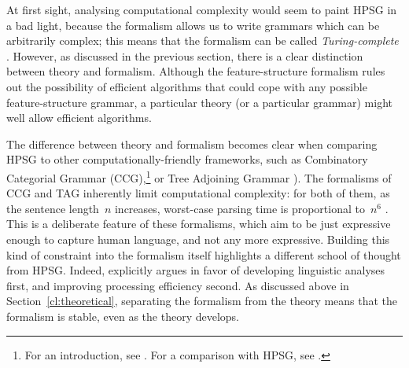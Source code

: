 \documentclass[output=paper]{langsci/langscibook}
\begin{document}
At first sight, analysing computational complexity
would seem to paint HPSG in a bad light,
because the formalism allows us to write grammars
which can be arbitrarily complex;
this means that the formalism can be called \textit{Turing-complete}
\citep[Section~3.4]{Johnson88}.
However, as discussed in the previous section,
there is a clear distinction between theory and formalism.
Although the feature-structure formalism rules out the possibility of efficient algorithms
that could cope with any possible feature-structure grammar,
a particular theory (or a particular grammar) might well allow efficient algorithms.

The difference between theory and formalism
becomes clear when comparing HPSG to other computationally-friendly frameworks,
such as Combinatory Categorial Grammar (CCG),\footnote{%
	For an introduction, see \citet{steedman2011ccg}.
	For a comparison with HPSG, see .
}
or Tree Adjoining Grammar \citep[TAG;][]{Joshi87a-u,SAJ88a-u}).
The formalisms of CCG and TAG inherently limit computational complexity:
for both of them, as the sentence length~$n$ increases,
worst-case parsing time is proportional to~$n^6$ \citep{Kasamietal1989}.
This is a deliberate feature of these formalisms,
which aim to be just expressive enough to capture human language,
and not any more expressive.
Building this kind of constraint into the formalism itself
highlights a different school of thought from HPSG.
Indeed, \citet{MuellerCoreGram} explicitly argues
in favor of developing linguistic analyses first,
and improving processing efficiency second.
As discussed above in Section~\ref{cl:theoretical},
separating the formalism from the theory
means that the formalism is stable, even as the theory develops.

\end{document}
